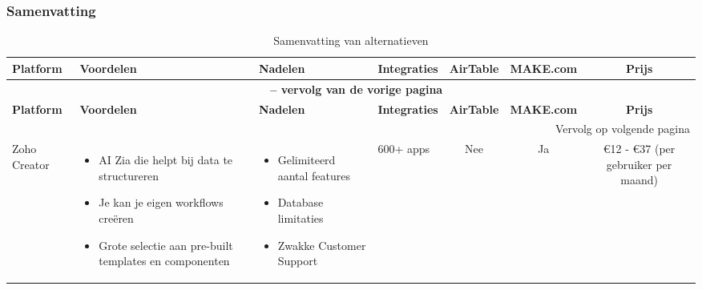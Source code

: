 \subsubsection*{Samenvatting}
\begin{longtable}{p{2.2cm} p{2.4cm} p{2.4cm} p{2.2cm} c c c}
    \caption{Samenvatting van alternatieven} \label{samenvatting-alternatieven} \\
    \toprule
    \textbf{Platform} & \textbf{Voordelen} & \textbf{Nadelen} & \textbf{Integraties} & \textbf{AirTable} & \textbf{MAKE.com} & \textbf{Prijs} \\
    \midrule
    \endfirsthead

    \multicolumn{7}{c}{{\bfseries \tablename\ \thetable{} -- vervolg van de vorige pagina}} \\
    \toprule
    \textbf{Platform} & \textbf{Voordelen} & \textbf{Nadelen} & \textbf{Integraties} & \textbf{AirTable} & \textbf{MAKE.com} & \textbf{Prijs} \\
    \midrule
    \endhead

    \midrule
    \multicolumn{7}{r}{{Vervolg op volgende pagina}} \\
    \endfoot

    \bottomrule
    \endlastfoot

    Zoho Creator & 
    \begin{itemize}
        \item AI Zia die helpt bij data te structureren
        \item Je kan je eigen workflows creëren
        \item Grote selectie aan pre-built templates en componenten
    \end{itemize} & 
    \begin{itemize}
        \item Gelimiteerd aantal features
        \item Database limitaties
        \item Zwakke Customer Support
    \end{itemize} &
    600+ apps &
    Nee &
    Ja &
    €12 - €37 (per gebruiker per maand)\\


\end{longtable}

